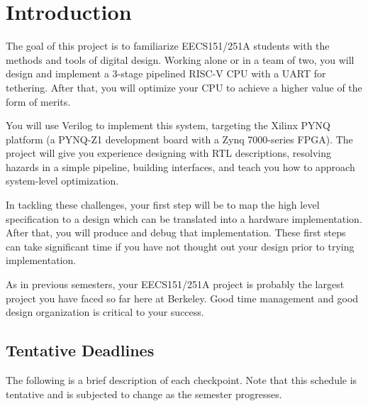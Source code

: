 \section{Introduction}
The goal of this project is to familiarize EECS151/251A students with the methods and tools of digital design.
Working alone or in a team of two, you will design and implement a 3-stage pipelined RISC-V CPU with a UART for tethering.
After that, you will optimize your CPU to achieve a higher value of the form of merits.

You will use Verilog to implement this system, targeting the Xilinx PYNQ platform (a PYNQ-Z1 development board with a Zynq 7000-series FPGA).
The project will give you experience designing with RTL descriptions, resolving hazards in a simple pipeline, building interfaces, and teach you how to approach system-level optimization.

In tackling these challenges, your first step will be to map the high level specification to a design which can be translated into a hardware implementation.
After that, you will produce and debug that implementation.
These first steps can take significant time if you have not thought out your design prior to trying implementation.

As in previous semesters, your EECS151/251A project is probably the largest project you have faced so far here at Berkeley.
Good time management and good design organization is critical to your success.


\subsection{Tentative Deadlines}
The following is a brief description of each checkpoint.
Note that this schedule is tentative and is subjected to change as the semester progresses.

